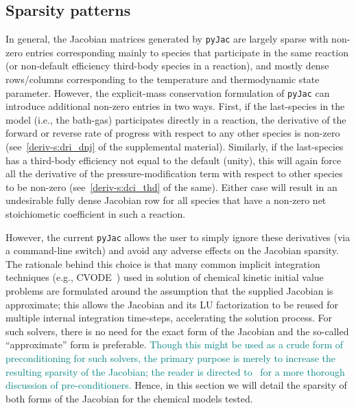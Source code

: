 \documentclass[12pt,number,sort&compress,preprint]{elsarticle}
\newcommand{\add}[1]{{\sloppy\textcolor{teal}{#1}}}  %
\begin{document}
\subsection{Sparsity patterns}
\label{S:sparsity}

In general, the Jacobian matrices generated by \texttt{pyJac} are largely sparse with non-zero entries corresponding mainly to species that participate in the same reaction (or non-default efficiency third-body species in a reaction), and mostly dense rows\slash columns corresponding to the temperature and thermodynamic state parameter.
However, the explicit-mass conservation formulation of \texttt{pyJac} can introduce additional non-zero entries in two ways.
First, if the last-species in the model (i.e., the bath-gas) participates directly in a reaction, the derivative of the forward or reverse rate of progress with respect to any other species is non-zero (see~\cref{deriv-s:dri_dnj} of the supplemental material).
Similarly, if the last-species has a third-body efficiency not equal to the default (unity), this will again force all the derivative of the pressure-modification term with respect to other species to be non-zero (see~\cref{deriv-s:dci_thd} of the same).
Either case will result in an undesirable fully dense Jacobian row for all species that have a non-zero net stoichiometic coefficient in such a reaction.

However, the current \texttt{pyJac} allows the user to simply ignore these derivatives (via a command-line switch) and avoid any adverse effects on the Jacobian sparsity.
The rationale behind this choice is that many common implicit integration techniques (e.g., CVODE~\cite{Hindmarsh:2005}) used in solution of chemical kinetic initial value problems are formulated around the assumption that the supplied Jacobian is approximate; this allows the Jacobian and its LU factorization to be reused for multiple internal integration time-steps, accelerating the solution process.
For such solvers, there is no need for the exact form of the Jacobian and the so-called ``approximate'' form is preferable.
\add{Though this might be used as a crude form of preconditioning for such solvers, the primary purpose is merely to increase the resulting sparsity of the Jacobian; the reader is directed to~\cite{MCNENLY2015581} for a more thorough discussion of pre-conditioners.}
Hence, in this section we will detail the sparsity of both forms of the Jacobian for the chemical models tested.
\end{document}
